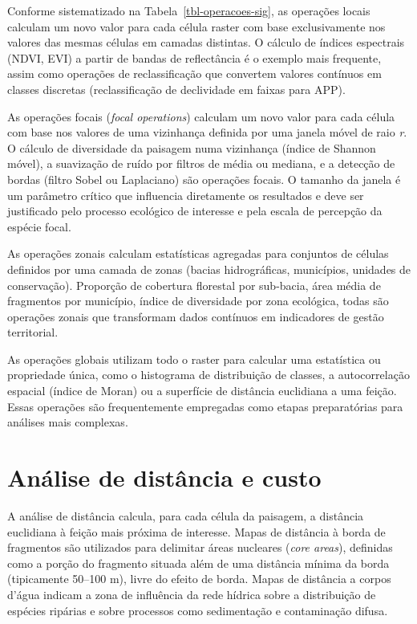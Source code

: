 \documentclass[
  portuguese,
  11pt,
  a4paper,
  open=any]{scrbook}
\begin{document}
Conforme sistematizado na Tabela~\ref{tbl-operacoes-sig}, as operações
locais calculam um novo valor para cada célula raster com base
exclusivamente nos valores das mesmas células em camadas distintas. O
cálculo de índices espectrais (NDVI, EVI) a partir de bandas de
reflectância é o exemplo mais frequente, assim como operações de
reclassificação que convertem valores contínuos em classes discretas
(reclassificação de declividade em faixas para APP).

As operações focais (\emph{focal operations}) calculam um novo valor
para cada célula com base nos valores de uma vizinhança definida por uma
janela móvel de raio \emph{r}. O cálculo de diversidade da paisagem numa
vizinhança (índice de Shannon móvel), a suavização de ruído por filtros
de média ou mediana, e a detecção de bordas (filtro Sobel ou Laplaciano)
são operações focais. O tamanho da janela é um parâmetro crítico que
influencia diretamente os resultados e deve ser justificado pelo
processo ecológico de interesse e pela escala de percepção da espécie
focal.

As operações zonais calculam estatísticas agregadas para conjuntos de
células definidos por uma camada de zonas (bacias hidrográficas,
municípios, unidades de conservação). Proporção de cobertura florestal
por sub-bacia, área média de fragmentos por município, índice de
diversidade por zona ecológica, todas são operações zonais que
transformam dados contínuos em indicadores de gestão territorial.

As operações globais utilizam todo o raster para calcular uma
estatística ou propriedade única, como o histograma de distribuição de
classes, a autocorrelação espacial (índice de Moran) ou a superfície de
distância euclidiana a uma feição. Essas operações são frequentemente
empregadas como etapas preparatórias para análises mais complexas.

\section{Análise de distância e
custo}\label{anuxe1lise-de-distuxe2ncia-e-custo}

A análise de distância calcula, para cada célula da paisagem, a
distância euclidiana à feição mais próxima de interesse. Mapas de
distância à borda de fragmentos são utilizados para delimitar áreas
nucleares (\emph{core areas}), definidas como a porção do fragmento
situada além de uma distância mínima da borda (tipicamente 50--100 m),
livre do efeito de borda. Mapas de distância a corpos d'água indicam a
zona de influência da rede hídrica sobre a distribuição de espécies
ripárias e sobre processos como sedimentação e contaminação difusa.
\end{document}
